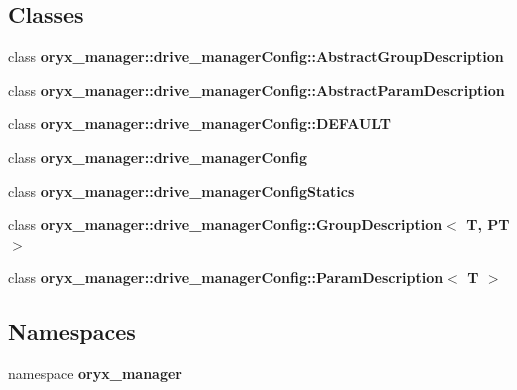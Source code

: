 \subsection*{\-Classes}
\begin{DoxyCompactItemize}
\item 
class {\bf oryx\-\_\-manager\-::drive\-\_\-manager\-Config\-::\-Abstract\-Group\-Description}
\item 
class {\bf oryx\-\_\-manager\-::drive\-\_\-manager\-Config\-::\-Abstract\-Param\-Description}
\item 
class {\bf oryx\-\_\-manager\-::drive\-\_\-manager\-Config\-::\-D\-E\-F\-A\-U\-L\-T}
\item 
class {\bf oryx\-\_\-manager\-::drive\-\_\-manager\-Config}
\item 
class {\bf oryx\-\_\-manager\-::drive\-\_\-manager\-Config\-Statics}
\item 
class {\bf oryx\-\_\-manager\-::drive\-\_\-manager\-Config\-::\-Group\-Description$<$ T, P\-T $>$}
\item 
class {\bf oryx\-\_\-manager\-::drive\-\_\-manager\-Config\-::\-Param\-Description$<$ T $>$}
\end{DoxyCompactItemize}
\subsection*{\-Namespaces}
\begin{DoxyCompactItemize}
\item 
namespace {\bf oryx\-\_\-manager}
\end{DoxyCompactItemize}
